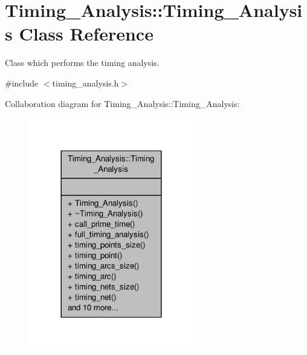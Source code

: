 \hypertarget{classTiming__Analysis_1_1Timing__Analysis}{\section{Timing\-\_\-\-Analysis\-:\-:Timing\-\_\-\-Analysis Class Reference}
\label{classTiming__Analysis_1_1Timing__Analysis}
}


Class which performs the timing analysis.  




{\ttfamily \#include $<$timing\-\_\-analysis.\-h$>$}



Collaboration diagram for Timing\-\_\-\-Analysis\-:\-:Timing\-\_\-\-Analysis\-:\nopagebreak
\begin{figure}[H]
\begin{center}
\leavevmode
\includegraphics[width=204pt]{classTiming__Analysis_1_1Timing__Analysis__coll__graph}
\end{center}
\end{figure}
